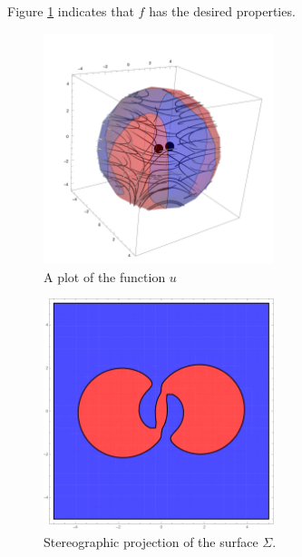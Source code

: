 \begin{example}
  Figure \ref{pl:n3_hf_inflowOutflowStagnationPoint_overview}
  indicates that $f$ has the desired properties.
  \begin{figure}
    \centering
    \includegraphics[width=0.6\textwidth]{../plots/n3_hf_inflowOutflow_Ball_overview.pdf}
    \caption{A plot of the function $u$}
    \label{pl:n3_hf_inflowOutflowStagnationPoint_overview}
  \end{figure}
  \begin{figure}
    \centering
    \includegraphics[width=0.6\textwidth]{../plots/n3_hf_inflowOutflow_Ball_Surface.pdf}
    \caption{Stereographic projection of the surface $\Sigma$.}
    \label{pl:n3_hf_inflowOutflowStagnationPoint_Surface}
  \end{figure}
\end{example}


